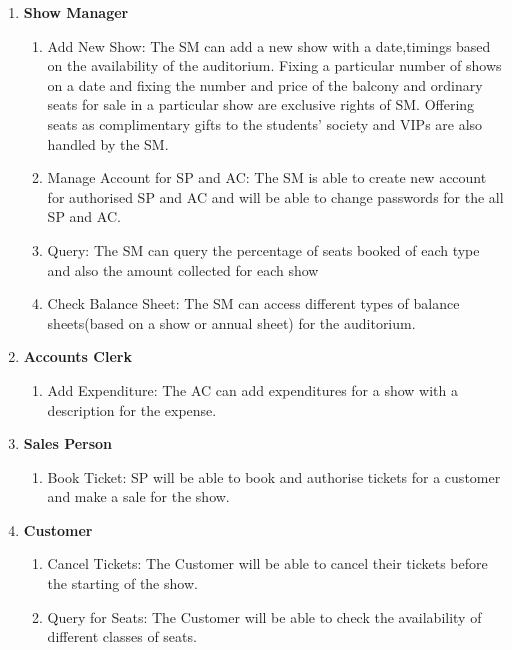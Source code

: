 \documentclass{scrreprt}
\begin{document}
\begin{enumerate}
\item \textbf{Show Manager}
	\begin{enumerate}
		\item Add New Show: The SM can add a new show with a date,timings based on the availability of the auditorium. Fixing a particular number of shows on a date and fixing the number and price of the balcony and ordinary seats for sale in a particular show are exclusive rights of SM. Offering seats as complimentary gifts to the students' society and VIPs are also handled by the SM.

		\item Manage Account for SP and AC: The SM is able to create new account for authorised SP and AC and will be able to change passwords for the all SP and AC.
		
		\item Query: The SM can query the percentage of seats booked of each type and also the amount collected for each show
		
		\item Check Balance Sheet: The SM can access different types of balance sheets(based on a show or annual sheet) for the auditorium.
		
	\end{enumerate}
	
\item \textbf{Accounts Clerk}
	\begin{enumerate}
	
		\item Add Expenditure: The AC can add expenditures for a show with a description for the expense. 
		
	\end{enumerate}

\item \textbf{Sales Person}
	\begin{enumerate}
		\item  Book Ticket: SP will be able to book and authorise tickets for a customer and make a sale for the show.
	\end{enumerate}

\item \textbf{Customer}
	\begin{enumerate}
		
		\item Cancel Tickets: The Customer will be able to cancel their tickets before the starting of the show.
		
		\item Query for Seats: The Customer will be able to check the availability of different classes of seats.
		
	\end{enumerate}
 
 
\end{enumerate}
\end{document}
